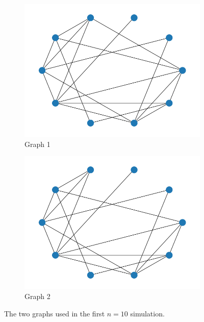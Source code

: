 \begin{figure}
\centering
\begin{subfigure}{0.45\textwidth}
    \centering
    \includegraphics[width=\textwidth]{Figs/n=10_graph_1.png}
    \caption{Graph 1}
\end{subfigure}
\hfill
\begin{subfigure}{0.45\textwidth}
    \centering
    \includegraphics[width=\textwidth]{Figs/n=10_graph_2.png}
    \caption{Graph 2}
\end{subfigure}
\caption{The two graphs used in the first $n=10$ simulation.}
\label{fig:graphs}
\end{figure}

